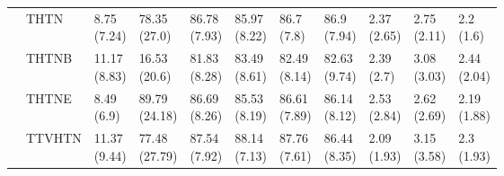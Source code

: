 \begin{table}
\begin{tabular}{lllllllllll}
       & THTN &    \makecell{8.75\\(7.24)} &   \makecell{78.35\\(27.0)} &   \makecell{86.78\\(7.93)} &  \makecell{85.97\\(8.22)} &    \makecell{86.7\\(7.8)} &    \makecell{86.9\\(7.94)} &      \makecell{2.37\\(2.65)} &  \makecell{2.75\\(2.11)} &    \makecell{2.2\\(1.6)} \\
       & THTNB &   \makecell{11.17\\(8.83)} &   \makecell{16.53\\(20.6)} &   \makecell{81.83\\(8.28)} &  \makecell{83.49\\(8.61)} &  \makecell{82.49\\(8.14)} &   \makecell{82.63\\(9.74)} &       \makecell{2.39\\(2.7)} &  \makecell{3.08\\(3.03)} &  \makecell{2.44\\(2.04)} \\
       & THTNE &     \makecell{8.49\\(6.9)} &  \makecell{89.79\\(24.18)} &   \makecell{86.69\\(8.26)} &  \makecell{85.53\\(8.19)} &  \makecell{86.61\\(7.89)} &   \makecell{86.14\\(8.12)} &      \makecell{2.53\\(2.84)} &  \makecell{2.62\\(2.69)} &  \makecell{2.19\\(1.88)} \\
       & TTVHTN &   \makecell{11.37\\(9.44)} &  \makecell{77.48\\(27.79)} &   \makecell{87.54\\(7.92)} &  \makecell{88.14\\(7.13)} &  \makecell{87.76\\(7.61)} &   \makecell{86.44\\(8.35)} &      \makecell{2.09\\(1.93)} &  \makecell{3.15\\(3.58)} &   \makecell{2.3\\(1.93)} \\

\end{tabular}
\end{table}
